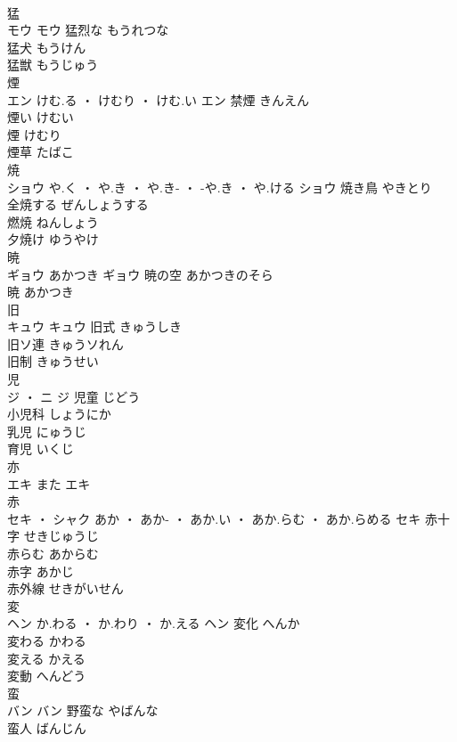 \documentclass[8pt]{extreport}
\begin{document}
\begin{CJK}{UTF8}{min}
\\	猛	
\\	モウ		モウ	猛烈な	もうれつな	
\\	猛犬	もうけん	
\\	猛獣	もうじゅう	
\\	煙	
\\	エン	けむ.る ・ けむり ・ けむ.い	エン	禁煙	きんえん	
\\	煙い	けむい	
\\	煙	けむり	
\\	煙草	たばこ	
\\	焼	
\\	ショウ	や.く ・ や.き ・ や.き- ・ -や.き ・ や.ける	ショウ	焼き鳥	やきとり	
\\	全焼する	ぜんしょうする	
\\	燃焼	ねんしょう	
\\	夕焼け	ゆうやけ	
\\	暁	
\\	ギョウ	あかつき	ギョウ	暁の空	あかつきのそら	
\\	暁	あかつき	
\\	旧	
\\	キュウ		キュウ	旧式	きゅうしき	
\\	旧ソ連	きゅうソれん	
\\	旧制	きゅうせい	
\\	児	
\\	ジ ・ ニ		ジ	児童	じどう	
\\	小児科	しょうにか	
\\	乳児	にゅうじ	
\\	育児	いくじ	
\\	亦	
\\	エキ	また	エキ																																			
\\	赤	
\\	セキ ・ シャク	あか ・ あか- ・ あか.い ・ あか.らむ ・ あか.らめる	セキ	赤十字	せきじゅうじ	
\\	赤らむ	あからむ	
\\	赤字	あかじ	
\\	赤外線	せきがいせん	
\\	変	
\\	ヘン	か.わる ・ か.わり ・ か.える	ヘン	変化	へんか	
\\	変わる	かわる	
\\	変える	かえる	
\\	変動	へんどう	
\\	蛮	
\\	バン		バン	野蛮な	やばんな	
\\	蛮人	ばんじん	

\end{CJK}
\end{document}
